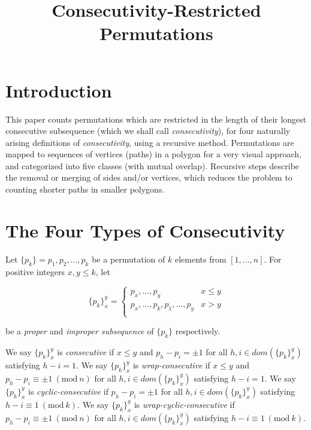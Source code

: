 \documentclass[a4paper, 12pt] {article}
\theoremstyle{remark}
\theoremstyle{plain}
\theoremstyle{remark}
\begin{document}
\title{Consecutivity-Restricted Permutations}



\section{Introduction}
\label{introduction}

This paper counts permutations which are restricted in the length of their longest consecutive subsequence (which we shall call \emph{consecutivity}), for four naturally arising definitions of \emph{consecutivity}, using a recursive method. Permutations are mapped to sequences of vertices (paths) in a polygon for a very visual approach, and categorized into five classes (with mutual overlap). Recursive steps describe the removal or merging of sides and/or vertices, which reduces the problem to counting shorter paths in smaller polygons. 


\section{The Four Types of Consecutivity}
\label{four_consecutivities}

\begin{comment}
Let $\{a_m\} = a_1, a_2, ..., a_m$ be a finite sequence containing no repeated elements.
Let $\{a\}_{x}^{y} = a_1, a_2, ..., a_m$ be a subsequence of a permutation of $k$ elements from $[1, ..., n]$.

For positive integers $x, y \leq k$, let $\{p_{i\ \textrm{mod}\ k}\}_{i=x}^{y+k} = p_x, ..., p_y$ be a \textit{subsequence} of $\{p_k\}$.
\end{comment}

Let $\{p_k\} = p_1, p_2, ..., p_k$ be a permutation of $k$ elements from $[1, ..., n]$. For positive integers $x, y \leq k$, let

$$\{p_k\}_{x}^{y} =
\begin{cases}
	p_x, ..., p_y & x\leq y \\
	p_x, ..., p_k, p_1, ..., p_y & x>y \\
\end{cases} $$

\noindent be a \textit{proper} and \textit{improper subsequence} of $\{p_k\}$ respectively.

We say $\{p_k\}_{x}^{y}$ is \textit{consecutive} if $x \leq y$ and $p_h-p_i=\pm1$ for all $h,i \in dom(\{p_k\}_{x}^{y})$ satisfying $h-i = 1$.
We say $\{p_k\}_{x}^{y}$ is \textit{wrap-consecutive} if $x \leq y$ and $p_h-p_i \equiv \pm1 \ (\textrm{mod}\ n)$ for all $h,i \in dom(\{p_k\}_{x}^{y})$ satisfying $h-i = 1$.
We say $\{p_k\}_{x}^{y}$ is \textit{cyclic-consecutive} if $p_h-p_i=\pm1$ for all $h,i \in dom(\{p_k\}_{x}^{y})$ satisfying $h-i \equiv 1 \ (\textrm{mod}\ k)$.
We say $\{p_k\}_{x}^{y}$ is \textit{wrap-cyclic-consecutive} if $p_h-p_i \equiv \pm1 \ (\textrm{mod}\ n)$ for all $h,i \in dom(\{p_k\}_{x}^{y})$ satisfying $h-i \equiv 1 \ (\textrm{mod}\ k)$.
\end{document}
